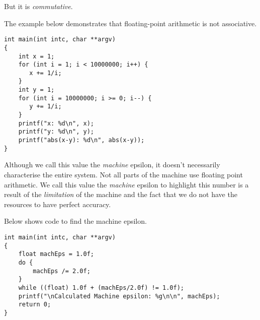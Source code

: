 But it is \textit{commutative}. 

\begin{example}
The example below demonstrates that floating-point arithmetic is not associative.

\begin{lstlisting}
int main(int intc, char **argv) 
{
    int x = 1;
    for (int i = 1; i < 10000000; i++) {
       x += 1/i;
    }
    int y = 1;
    for (int i = 10000000; i >= 0; i--) {
       y += 1/i;
    }
    printf("x: %d\n", x);
    printf("y: %d\n", y);
    printf("abs(x-y): %d\n", abs(x-y));
}
\end{lstlisting}
\end{example}

\frmrule 


\frmrule 




Although we call this value the \textit{machine} epsilon, 
it doesn't necessarily characterise the entire system. 
Not all parts of the machine use floating point arithmetic. 
We call this value the \textit{machine} epsilon 
to highlight this number is a result of the \textit{limitation} of the machine 
and the fact that we do not have the resources to have perfect accuracy.  


Below shows code to find the machine epsilon. 

\begin{lstlisting}
int main(int intc, char **argv) 
{
    float machEps = 1.0f;
    do {
        machEps /= 2.0f;
    }
    while ((float) 1.0f + (machEps/2.0f) != 1.0f);
    printf("\nCalculated Machine epsilon: %g\n\n", machEps); 
    return 0;
}
\end{lstlisting}




